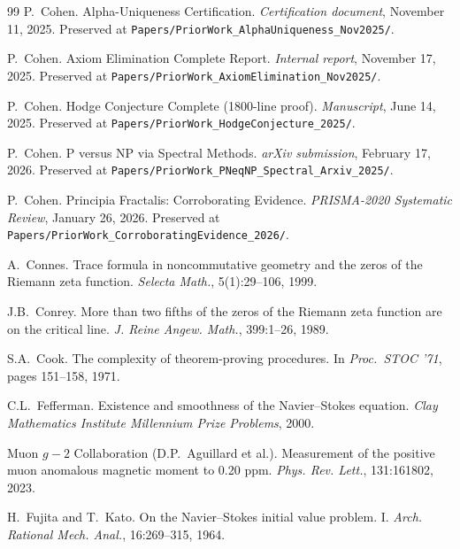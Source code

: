 \documentclass[11pt,a4paper]{amsart}
\theoremstyle{plain}
\theoremstyle{definition}
\begin{document}
\begin{thebibliography}{99}
P.~Cohen.
\newblock Alpha-Uniqueness Certification.
\newblock \emph{Certification document}, November 11, 2025. Preserved at \texttt{Papers/PriorWork\_AlphaUniqueness\_Nov2025/}.

P.~Cohen.
\newblock Axiom Elimination Complete Report.
\newblock \emph{Internal report}, November 17, 2025. Preserved at \texttt{Papers/PriorWork\_AxiomElimination\_Nov2025/}.

P.~Cohen.
\newblock Hodge Conjecture Complete (1800-line proof).
\newblock \emph{Manuscript}, June 14, 2025. Preserved at \texttt{Papers/PriorWork\_HodgeConjecture\_2025/}.

P.~Cohen.
\newblock P versus NP via Spectral Methods.
\newblock \emph{arXiv submission}, February 17, 2026. Preserved at \texttt{Papers/PriorWork\_PNeqNP\_Spectral\_Arxiv\_2025/}.

P.~Cohen.
\newblock Principia Fractalis: Corroborating Evidence.
\newblock \emph{PRISMA-2020 Systematic Review}, January 26, 2026. Preserved at \texttt{Papers/PriorWork\_CorroboratingEvidence\_2026/}.

A.~Connes.
\newblock Trace formula in noncommutative geometry and the zeros of the Riemann zeta function.
\newblock \emph{Selecta Math.}, 5(1):29--106, 1999.

J.B.~Conrey.
\newblock More than two fifths of the zeros of the Riemann zeta function are on the critical line.
\newblock \emph{J. Reine Angew. Math.}, 399:1--26, 1989.

S.A.~Cook.
\newblock The complexity of theorem-proving procedures.
\newblock In \emph{Proc.\ STOC '71}, pages 151--158, 1971.

C.L.~Fefferman.
\newblock Existence and smoothness of the Navier--Stokes equation.
\newblock \emph{Clay Mathematics Institute Millennium Prize Problems}, 2000.

Muon $g-2$ Collaboration (D.P.~Aguillard et al.).
\newblock Measurement of the positive muon anomalous magnetic moment to 0.20 ppm.
\newblock \emph{Phys. Rev. Lett.}, 131:161802, 2023.

H.~Fujita and T.~Kato.
\newblock On the Navier--Stokes initial value problem. I.
\newblock \emph{Arch. Rational Mech. Anal.}, 16:269--315, 1964.


\end{thebibliography}
\end{document}
